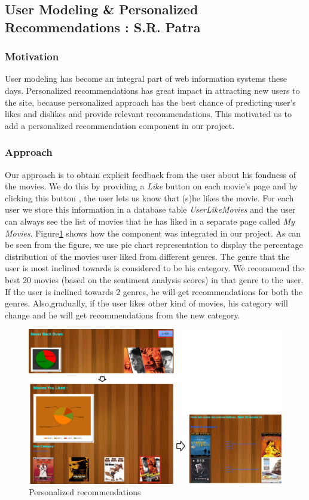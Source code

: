  \subsection{User Modeling \& Personalized Recommendations : S.R. Patra}    
 \subsubsection{Motivation}
 User modeling has become an integral part of web information systems these days. Personalized recommendations has  great impact in attracting new users to the site, because personalized approach has the best chance of predicting user's likes and dislikes and provide relevant recommendations. This motivated us to add a personalized recommendation component in our project.
 
  \subsubsection{Approach}
  Our approach is to obtain explicit feedback from the user about his fondness of the movies. We do this by providing a \textit{Like} button on each movie's page and by clicking this button , the user lets us know that (s)he likes the movie. For each user we store this information in a database table \textit{UserLikeMovies} and the user can always see the list of movies that he has liked in a separate page called \textit{My Movies}. Figure\ref{fig:like} shows how the component was integrated in our project. As can be seen from the figure, we use pie chart representation\cite{pie} to display the percentage distribution of the movies user liked from different genres. The genre that the user is most inclined towards is considered to be his category. We recommend the best 20 movies (based on the sentiment analysis scores) in that genre to the user. If the user is inclined towards 2 genres, he will get recommendations for both the genres. Also,gradually, if the user likes other kind of movies, his category will change and he will get recommendations from the new category.
  
  \begin{figure}[H]
    \centering
    \includegraphics[width=5in]{like.png}
    \caption{Personalized recommendations}
    \label{fig:like}
    \end{figure} 
    
